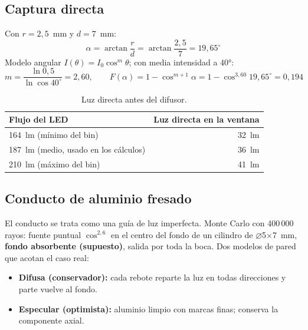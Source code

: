 \documentclass[11pt,a4paper]{article}
\begin{document}
\subsection{Captura directa}\label{sec:directa}
Con $r = 2{,}5$~mm y $d = 7$~mm:
\begin{equation}
  \alpha = \arctan\frac{r}{d} = \arctan\frac{2{,}5}{7} = 19{,}65^\circ
\end{equation}
Modelo angular $I(\theta) = I_0\cos^m\theta$; con media intensidad a 40°:
\begin{equation}
  m = \frac{\ln 0{,}5}{\ln \cos 40^\circ} = 2{,}60, \qquad
  F(\alpha) = 1 - \cos^{m+1}\alpha = 1 - \cos^{3{,}60} 19{,}65^\circ = 0{,}194
\end{equation}

\begin{table}[H]\centering\small
\begin{tabular}{l r}
\toprule
Flujo del LED & Luz directa en la ventana\\
\midrule
164~lm (mínimo del bin) & 32~lm\\
187~lm (medio, usado en los cálculos) & 36~lm\\
210~lm (máximo del bin) & 41~lm\\
\bottomrule
\end{tabular}
\caption{Luz directa antes del difusor.}
\end{table}

\subsection{Conducto de aluminio fresado}\label{sec:conducto}
El conducto se trata como una guía de luz imperfecta. Monte Carlo con 400\,000 rayos: fuente puntual
$\cos^{2,6}$ en el centro del fondo de un cilindro de $\varnothing$5$\times$7~mm, \textbf{fondo absorbente
(supuesto)}, salida por toda la boca. Dos modelos de pared que acotan el caso real:

\begin{itemize}
  \item \textbf{Difusa (conservador):} cada rebote reparte la luz en todas direcciones y parte vuelve al fondo.
  \item \textbf{Especular (optimista):} aluminio limpio con marcas finas; conserva la componente axial.
\end{itemize}
\end{document}
